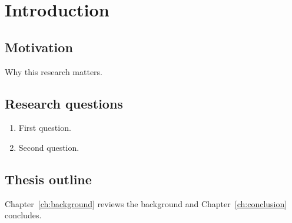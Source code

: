\chapter{Introduction}
\label{ch:intro}

\section{Motivation}
Why this research matters.

\section{Research questions}
\begin{enumerate}
  \item First question.
  \item Second question.
\end{enumerate}

\section{Thesis outline}
Chapter~\ref{ch:background} reviews the background and Chapter~\ref{ch:conclusion} concludes.
